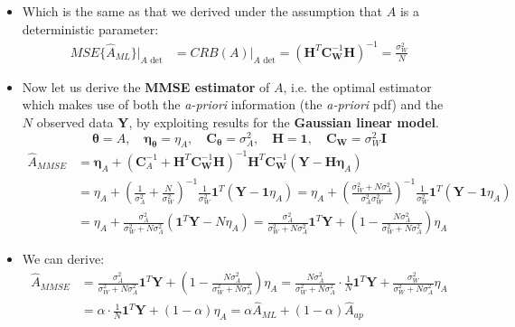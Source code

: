 \begin{itemize}
\item Which is the same as that we derived under the assumption that \(A\) is a deterministic parameter:
\begin{align*}
MSE\{\hat{A}_{ML}\}|_{A \text{ det}} &= CRB(A)|_{A \text{ det}} = \left(\mathbf{H}^{T} \mathbf{C}_{\mathbf{W}}^{-1} \mathbf{H}\right)^{-1} = \frac{\sigma_{W}^{2}}{N}
\end{align*}
\item Now let us derive the \textbf{MMSE estimator} of \(A\), i.e. the optimal estimator which makes use of both the \textit{a-priori} information (the \textit{a-priori} pdf) and the \(N\) observed data \textbf{Y}, by exploiting results for the \textbf{Gaussian linear model}.
$$\boxed{\boldsymbol{\theta} = A, \quad \boldsymbol{\eta}_{\boldsymbol{\theta}} = \eta_{A}, \quad \mathbf{C}_{\boldsymbol{\theta}} = \sigma_{A}^{2}, \quad \mathbf{H} = \mathbf{1}, \quad \mathbf{C}_{\mathbf{W}} = \sigma_{W}^{2} \mathbf{I}}$$
\vspace{-1.5em}
\begin{align*}
\hat{A}_{MMSE} &= \boldsymbol{\eta}_{A} + \left(\mathbf{C}_{A}^{-1} + \mathbf{H}^{T} \mathbf{C}_{\mathbf{W}}^{-1} \mathbf{H}\right)^{-1} \mathbf{H}^{T} \mathbf{C}_{\mathbf{W}}^{-1} (\mathbf{Y} - \mathbf{H} \boldsymbol{\eta}_{A}) \\[6pt]
&= \eta_{A} + \left(\frac{1}{\sigma_{A}^{2}} + \frac{N}{\sigma_{W}^{2}}\right)^{-1} \frac{1}{\sigma_{W}^{2}} \mathbf{1}^{T} (\mathbf{Y} - \mathbf{1}\eta_{A}) = \eta_{A} + \left(\frac{\sigma_{W}^{2} + N\sigma_{A}^{2}}{\sigma_{A}^{2} \sigma_{W}^{2}}\right)^{-1} \frac{1}{\sigma_{W}^{2}} \mathbf{1}^{T} (\mathbf{Y} - \mathbf{1}\eta_{A}) \\[6pt]
&= \eta_{A} + \frac{\sigma_{A}^{2}}{\sigma_{W}^{2} + N\sigma_{A}^{2}} (\mathbf{1}^{T} \mathbf{Y} - N\eta_{A}) = \frac{\sigma_{A}^{2}}{\sigma_{W}^{2} + N\sigma_{A}^{2}} \mathbf{1}^{T} \mathbf{Y} + \left(1 - \frac{N\sigma_{A}^{2}}{\sigma_{W}^{2} + N\sigma_{A}^{2}}\right)\eta_{A}
\end{align*}
\item We can derive:
\begin{align*}
\hat{A}_{MMSE} &= \frac{\sigma_{A}^{2}}{\sigma_{W}^{2} + N\sigma_{A}^{2}} \mathbf{1}^{T} \mathbf{Y} + \left(1 - \frac{N\sigma_{A}^{2}}{\sigma_{W}^{2} + N\sigma_{A}^{2}}\right)\eta_{A} = \frac{N\sigma_{A}^{2}}{\sigma_{W}^{2} + N\sigma_{A}^{2}} \cdot \frac{1}{N} \mathbf{1}^{T} \mathbf{Y} + \frac{\sigma_{W}^{2}}{\sigma_{W}^{2} + N\sigma_{A}^{2}}\eta_{A} \\[1em]
&= \alpha \cdot \frac{1}{N} \mathbf{1}^{T} \mathbf{Y} + (1-\alpha)\eta_{A} = \alpha\hat{A}_{ML} + (1-\alpha)\hat{A}_{ap}

\end{align*}
\end{itemize}
